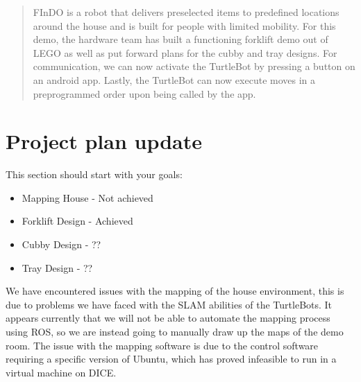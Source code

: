 \documentclass{article}
\begin{document}
 



\begin{abstract} 
FInDO is a robot that delivers preselected items to predefined locations around the house and is built for people with limited mobility. For this demo, the hardware team has built a functioning forklift demo out of LEGO as well as put forward plans for the cubby and tray designs. For communication, we can now activate the TurtleBot by pressing a button on an android app. Lastly, the TurtleBot can now execute moves in a preprogrammed order upon being called by the app.
\end{abstract} 


\section{Project plan update} 

This section should start with your goals:
\begin{itemize}
    \item Mapping House - Not achieved
    \item Forklift Design - Achieved 
    \item Cubby Design - ??
    \item Tray Design - ??
\end{itemize}

We have encountered issues with the mapping of the house environment, this is due to problems we have faced with the SLAM abilities of the TurtleBots. 
It appears currently that we will not be able to automate the mapping process using ROS, so we are instead going to manually draw up the maps of the demo room.
The issue with the mapping software is due to the control software requiring a specific version of Ubuntu, which has proved infeasible to run in a virtual machine on DICE.


\end{document}
